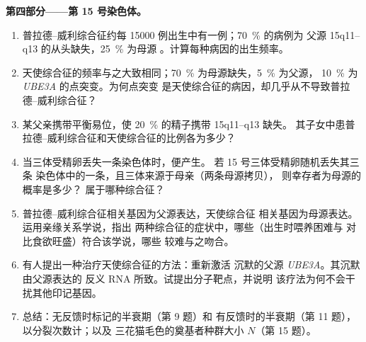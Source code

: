 \begin{problem}
\medskip
\noindent\textbf{第四部分——第 15 号染色体。}
\begin{enumerate}[resume]
  \item 普拉德–威利综合征约每
        \num{15000} 例出生中有一例；\qty{70}{\%} 的病例为
        父源 15q11--q13 的从头缺失，\qty{25}{\%} 为母源
        。计算每种病因的出生频率。
  \item 天使综合征的频率与之大致相同；\qty{70}{\%}
        为母源缺失，\qty{5}{\%} 为父源，
        \qty{10}{\%} 为 \emph{UBE3A} 的点突变。为何点突变
        是天使综合征的病因，却几乎从不导致普拉德–威利综合征？
  \item 某父亲携带平衡易位，使
        \qty{20}{\%} 的精子携带 15q11--q13 缺失。
        其子女中患普拉德–威利综合征和天使综合征的比例各为多少？
  \item 当三体受精卵丢失一条染色体时，便产生。
        若 15 号三体受精卵随机丢失其三条
        染色体中的一条，且三体来源于母亲（两条母源拷贝），
        则幸存者为母源的概率是多少？
        属于哪种综合征？
  \item 普拉德–威利综合征相关基因为父源表达，天使综合征
        相关基因为母源表达。运用亲缘关系学说，指出
        两种综合征的症状中，哪些（出生时喂养困难与
        对比食欲旺盛）符合该学说，哪些
        较难与之吻合。
  \item 有人提出一种治疗天使综合征的方法：重新激活
        沉默的父源 \emph{UBE3A}。其沉默由父源表达的
        反义 RNA 所致。试提出分子靶点，并说明
        该疗法为何不会干扰其他印记基因。
  \item 总结：无反馈时标记的半衰期（第 9 题）和
        有反馈时的半衰期（第 11 题），以分裂次数计；以及
        三花猫毛色的奠基者种群大小 $N$（第 15 题）。
\end{enumerate}
\end{problem}
